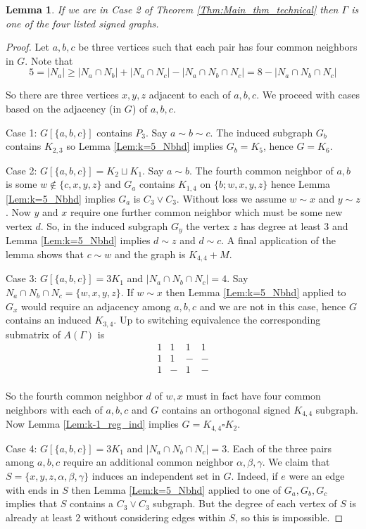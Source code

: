 \documentclass[11pt]{article}
\theoremstyle{plain}
\newtheorem{lemma}[theorem]{Lemma}
\theoremstyle{definition}
\begin{document}
\begin{lemma}\label{Lem:MT_D4triangle}
    If we are in Case 2 of Theorem \ref{Thm:Main_thm_technical} then $\Gamma$ is one of the four listed signed graphs.
\end{lemma}

\begin{proof}
    
Let $a,b,c$ be three vertices such that each pair has four common neighbors in $G$. Note that \[5=|N_a|\geqslant |N_a\cap N_b|+|N_a\cap N_c|-|N_a\cap N_b\cap N_c|=8-|N_a\cap N_b\cap N_c|\]

So there are three vertices $x,y,z$ adjacent to each of $a,b,c$. We proceed with cases based on the adjacency (in $G$) of $a,b,c$.


Case 1: $G[\{a,b,c\}]$ contains $P_3$. Say $a\sim b\sim c$. The induced subgraph $G_b$ contains $K_{2,3}$ so Lemma \ref{Lem:k=5_Nbhd} implies $G_b=K_5$, hence $G=K_6$.

Case 2: $G[\{a,b,c\}]=K_2\sqcup K_1$. Say $a\sim b$. The fourth common neighbor of $a,b$ is some $w\notin \{c,x,y,z\}$ and $G_a$ contains $K_{1,4}$ on $\{b;w,x,y,z\}$ hence Lemma \ref{Lem:k=5_Nbhd} implies $G_a$ is $C_3\lor C_3$. Without loss we assume $w\sim x$ and $y\sim z$. Now $y$ and $x$ require one further common neighbor which must be some new vertex $d$. So, in the induced subgraph $G_y$ the vertex $z$ has degree at least 3 and Lemma \ref{Lem:k=5_Nbhd} implies $d\sim z$ and $d\sim c$. A final application of the lemma shows that $c\sim w$ and the graph is $K_{4,4}+M$. 

Case 3: $G[\{a,b,c\}]=3K_1$ and $|N_a\cap N_b\cap N_c|=4$. Say $N_a\cap N_b\cap N_c=\{w,x,y,z\}$. If $w\sim x$ then Lemma \ref{Lem:k=5_Nbhd} applied to $G_x$ would require an adjacency among $a,b,c$ and we are not in this case, hence $G$ contains an induced $K_{3,4}$. Up to switching equivalence the corresponding submatrix of $A(\Gamma)$ is \[\begin{array}{cccccc}
    1&1&1&1\\1&1&-&-\\ 1&-&1&-\\
    \end{array}\]

So the fourth common neighbor $d$ of $w,x$ must in fact have four common neighbors with each of $a,b,c$ and $G$ contains an orthogonal signed $K_{4,4}$ subgraph. Now Lemma \ref{Lem:k-1_reg_ind} implies $G=K_{4,4}\square K_2$.

Case 4: $G[\{a,b,c\}]=3K_1$ and $|N_a\cap N_b\cap N_c|=3$. Each of the three pairs among $a,b,c$ require an additional common neighbor $\alpha,\beta,\gamma$. We claim that $S=\{x,y,z,\alpha,\beta,\gamma\}$ induces an independent set in $G$. Indeed, if $e$ were an edge with ends in $S$ then Lemma \ref{Lem:k=5_Nbhd} applied to one of $G_a,G_b,G_c$ implies that $S$ contains a $C_{3}\lor C_3$ subgraph. But the degree of each vertex of $S$ is already at least $2$ without considering edges within $S$, so this is impossible. 


\end{proof}
\end{document}
